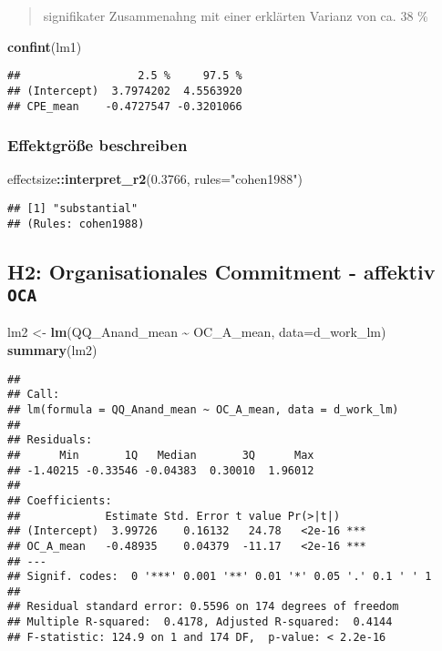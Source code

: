 \documentclass[
]{article}
\newenvironment{Shaded}{\begin{snugshade}}{\end{snugshade}}
\newcommand{\AttributeTok}[1]{\textcolor[rgb]{0.13,0.29,0.53}{#1}}
\newcommand{\FloatTok}[1]{\textcolor[rgb]{0.00,0.00,0.81}{#1}}
\newcommand{\FunctionTok}[1]{\textcolor[rgb]{0.13,0.29,0.53}{\textbf{#1}}}
\newcommand{\NormalTok}[1]{#1}
\newcommand{\OtherTok}[1]{\textcolor[rgb]{0.56,0.35,0.01}{#1}}
\newcommand{\SpecialCharTok}[1]{\textcolor[rgb]{0.81,0.36,0.00}{\textbf{#1}}}
\newcommand{\StringTok}[1]{\textcolor[rgb]{0.31,0.60,0.02}{#1}}
\begin{document}
\begin{quote}
signifikater Zusammenahng mit einer erklärten Varianz von ca. 38 \%
\end{quote}

\begin{Shaded}
\begin{Highlighting}[]
\FunctionTok{confint}\NormalTok{(lm1)}
\end{Highlighting}
\end{Shaded}

\begin{verbatim}
##                  2.5 %     97.5 %
## (Intercept)  3.7974202  4.5563920
## CPE_mean    -0.4727547 -0.3201066
\end{verbatim}

\subsubsection{Effektgröße
beschreiben}\label{effektgruxf6uxdfe-beschreiben}

\begin{Shaded}
\begin{Highlighting}[]
\NormalTok{effectsize}\SpecialCharTok{::}\FunctionTok{interpret\_r2}\NormalTok{(}\FloatTok{0.3766}\NormalTok{, }\AttributeTok{rules=}\StringTok{"cohen1988"}\NormalTok{)}
\end{Highlighting}
\end{Shaded}

\begin{verbatim}
## [1] "substantial"
## (Rules: cohen1988)
\end{verbatim}

\subsection{\texorpdfstring{H2: Organisationales Commitment - affektiv
\texttt{OCA}}{H2: Organisationales Commitment - affektiv OCA}}\label{h2-organisationales-commitment---affektiv-oca}

\begin{Shaded}
\begin{Highlighting}[]
\NormalTok{lm2 }\OtherTok{\textless{}{-}} \FunctionTok{lm}\NormalTok{(QQ\_Anand\_mean }\SpecialCharTok{\textasciitilde{}}\NormalTok{ OC\_A\_mean, }\AttributeTok{data=}\NormalTok{d\_work\_lm)}
\FunctionTok{summary}\NormalTok{(lm2)}
\end{Highlighting}
\end{Shaded}

\begin{verbatim}
## 
## Call:
## lm(formula = QQ_Anand_mean ~ OC_A_mean, data = d_work_lm)
## 
## Residuals:
##      Min       1Q   Median       3Q      Max 
## -1.40215 -0.33546 -0.04383  0.30010  1.96012 
## 
## Coefficients:
##             Estimate Std. Error t value Pr(>|t|)    
## (Intercept)  3.99726    0.16132   24.78   <2e-16 ***
## OC_A_mean   -0.48935    0.04379  -11.17   <2e-16 ***
## ---
## Signif. codes:  0 '***' 0.001 '**' 0.01 '*' 0.05 '.' 0.1 ' ' 1
## 
## Residual standard error: 0.5596 on 174 degrees of freedom
## Multiple R-squared:  0.4178, Adjusted R-squared:  0.4144 
## F-statistic: 124.9 on 1 and 174 DF,  p-value: < 2.2e-16
\end{verbatim}
\end{document}
